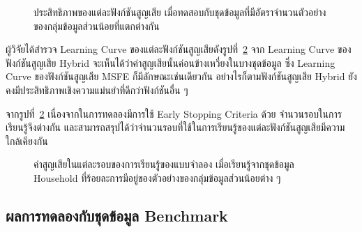\begin{figure}[h]
  \centering
  \caption{ประสิทธิภาพของแต่ละฟังก์ชันสูญเสีย เมื่อทดสอบกับชุดข้อมูลที่มีอัตราจำนวนตัวอย่างของกลุ่มข้อมูลส่วนน้อยที่แตกต่างกัน}
  \label{fig:result-cifar100}
\end{figure}
\FloatBarrier

ผู้วิจัยได้สำรวจ Learning Curve ของแต่ละฟังก์ชันสูญเสียดังรูปที่~\ref{fig:result-loss} จาก Learning Curve ของฟังก์ชันสูญเสีย Hybrid จะเห็นได้ว่าค่าสูญเสียนั้นค่อนข้างเหวี่ยงในบางชุดข้อมูล ซึ่ง Learning Curve ของฟังก์ชันสูญเสีย MSFE ก็มีลักษณะเช่นเดียวกัน อย่างไรก็ตามฟังก์ชันสูญเสีย Hybrid ยังคงมีประสิทธิภาพเชิงความแม่นยำที่ดีกว่าฟังก์ชันอื่น ๆ

จากรูปที่~\ref{fig:result-loss} เนื่องจากในการทดลองมีการใช้ Early Stopping Criteria ด้วย จำนวนรอบในการเรียนรู้จึงต่างกัน และสามารถสรุปได้ว่าจำนวนรอบที่ใช้ในการเรียนรู้ของแต่ละฟังก์ชันสูญเสียมีความใกล้เคียงกัน 

\begin{figure}[h]
  \centering
  \caption{ค่าสูญเสียในแต่ละรอบของการเรียนรู้ของแบบจำลอง เมื่อเรียนรู้จากชุดข้อมูล Household ที่ร้อยละการมีอยู่ของตัวอย่างของกลุ่มข้อมูลส่วนน้อยต่าง ๆ}
  \label{fig:result-loss}
\end{figure}

\subsection{ผลการทดลองกับชุดข้อมูล Benchmark}